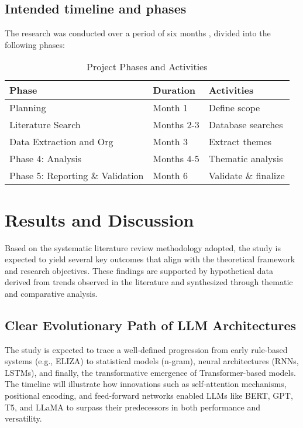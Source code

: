 \documentclass[conference]{IEEEtran}
\begin{document}
\subsection{Intended timeline and phases}
The research was conducted over a period of six months , divided into the following phases:
\begin{table}[h]
    \centering
    \begin{tabular}{|l|l|l|}
    \hline
    \textbf{Phase} & \textbf{Duration} & \textbf{Activities} \\ \hline
    Planning & Month 1 & Define scope \\
    Literature Search & Months 2-3 & Database searches \\ 
    Data Extraction and Org & Month 3 & Extract themes \\
    Phase 4: Analysis & Months 4-5 & Thematic analysis \\ 
    Phase 5: Reporting \& Validation & Month 6 & Validate \& finalize  \\ \hline
    \end{tabular} 
    \caption{Project Phases and Activities}
    \label{tab:project_phases}
\end{table}

\section{Results and Discussion}
Based on the systematic literature review methodology adopted, the study is expected to yield several key outcomes that align with the theoretical framework and research objectives. These findings are supported by hypothetical data derived from trends observed in the literature and synthesized through thematic and comparative analysis.
\subsection{Clear Evolutionary Path of LLM Architectures}
The study is expected to trace a well-defined progression from early rule-based systems (e.g., ELIZA) to statistical models (n-gram), neural architectures (RNNs, LSTMs), and finally, the transformative emergence of Transformer-based models. The timeline will illustrate how innovations such as self-attention mechanisms, positional encoding, and feed-forward networks enabled LLMs like BERT, GPT, T5, and LLaMA to surpass their predecessors in both performance and versatility.
\end{document}

